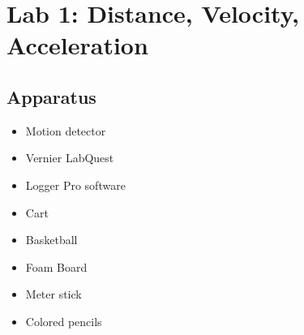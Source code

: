 

\usepackage{enumitem}
\usepackage{graphicx}
\graphicspath{ {./lab01images/} }


\renewcommand\assignment{Lab 1: Distance, Velocity, Acceleration, 1/31/2023, Partners: Maite Valentin-Lugo, Seth Waln}

    \section*{Lab 1: Distance, Velocity, Acceleration}

    \subsection*{Apparatus}

    \begin{itemize}
        \item Motion detector
        \item Vernier LabQuest
        \item Logger Pro software
        \item Cart
        \item Basketball
        \item Foam Board
        \item Meter stick
        \item Colored pencils
    \end{itemize}

